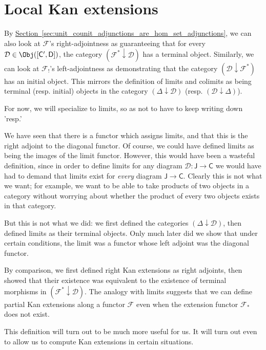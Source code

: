 \documentclass[notes.tex]{subfiles}
\begin{document}
\section{Local Kan extensions}
\label{sec:local_kan_extensions}

By \hyperref[sec:unit_counit_adjunctions_are_hom_set_adjunctions]{Section~\ref*{sec:unit_counit_adjunctions_are_hom_set_adjunctions}}, we can also look at $\mathcal{F}$'s right-adjointness as guaranteeing that for every $\mathcal{D} \in \Obj([\mathsf{C}', \mathsf{D}])$, the category $(\mathcal{F}^{*} \downarrow \mathcal{D})$ has a terminal object. Similarly, we can look at $\mathcal{F}_{!}$'s left-adjointness as demonstrating that the category $(\mathcal{D} \downarrow \mathcal{F}^{*})$ has an initial object. This mirrors the definition of limits and colimits as being terminal (resp. initial) objects in the category $(\Delta \downarrow \mathcal{D})$ (resp. $(\mathcal{D} \downarrow \Delta)$).

For now, we will specialize to limits, so as not to have to keep writing down 'resp.'

We have seen that there is a functor which assigns limits, and that this is the right adjoint to the diagonal functor. Of course, we could have defined limits as being the images of the limit functor. However, this would have been a wasteful definition, since in order to define limits for any diagram $\mathcal{D}\colon \mathsf{J} \to \mathsf{C}$ we would have had to demand that limits exist for \emph{every} diagram $\mathsf{J} \to \mathsf{C}$. Clearly this is not what we want; for example, we want to be able to take products of two objects in a category without worrying about whether the product of every two objects exists in that category.

But this is not what we did: we first defined the categories $(\Delta \downarrow \mathcal{D})$, then defined limits as their terminal objects. Only much later did we show that under certain conditions, the limit was a functor whose left adjoint was the diagonal functor.

By comparison, we first defined right Kan extensions as right adjoints, then showed that their existence was equivalent to the existence of terminal morphisms in $(\mathcal{F}^{*} \downarrow \mathcal{D})$. The analogy with limits suggests that we can define partial Kan extensions along a functor $\mathcal{F}$ even when the extension functor $\mathcal{F}_{*}$ does not exist.

This definition will turn out to be much more useful for us. It will turn out even to allow us to compute Kan extensions in certain situations.
\end{document}
